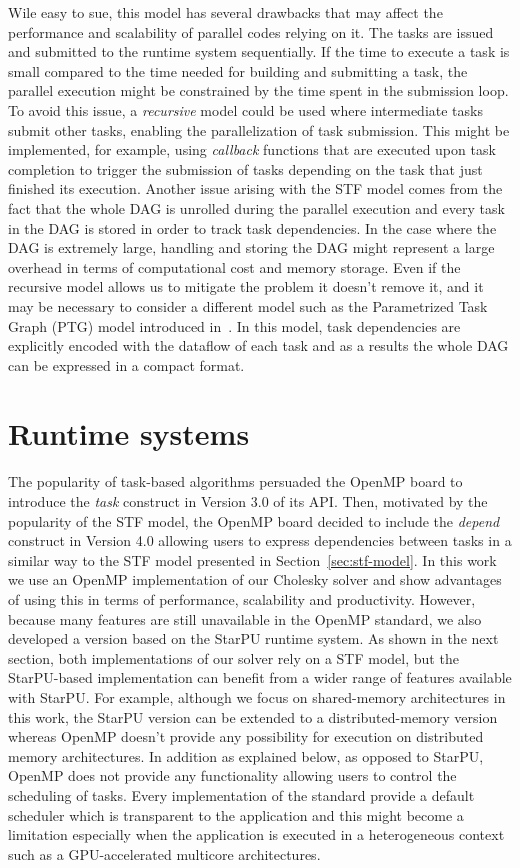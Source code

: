 \documentclass{article}
\newcommand{\starpu}{{StarPU}\xspace}
\newcommand{\openmp}{OpenMP\xspace}
\newcommand{\lsection}[1]{\section{#1} \setcounter{equation}{0} \setcounter{figure}{0} \setcounter{table}{0} \label{#1}}
\begin{document}
Wile easy to sue, this model
has several drawbacks that may affect the performance and scalability
of parallel codes relying on it. The tasks are issued and submitted to
the runtime system sequentially. If the time to execute a task
is small compared to the time needed for building
and submitting a task, the parallel execution might be constrained
by the time spent in the submission loop.
To avoid this issue, a
\textit{recursive} model could be used where intermediate tasks
submit other tasks, enabling the parallelization of task submission.
This might be implemented, for example, using
\textit{callback} functions that are executed upon task completion to
trigger the submission of tasks depending on the task that just
finished its execution. Another issue arising with the STF model comes
from the fact that the whole DAG is unrolled during the parallel
execution and every task in the DAG is stored in order to track task
dependencies. In the case where the DAG is extremely large, handling
and storing the DAG might represent a large overhead in terms of
computational cost and memory storage. Even if the recursive model
allows us to mitigate the problem it doesn't remove it, and it may be
necessary to consider a different model such as the
Parametrized Task Graph (PTG) model introduced in~\cite{c.l:95}. In
this model, task dependencies are explicitly encoded with the dataflow
of each task and as a results the whole DAG can be expressed in a
compact format.


\lsection{Runtime systems}\label{sec:runtime}
\setcounter{equation}{0}
\setcounter{table}{0}
\setcounter{figure}{0}

The popularity of task-based algorithms persuaded the OpenMP board to
introduce the \textit{task} construct in Version 3.0 of its API. Then,
motivated by the popularity of the STF model, the OpenMP board decided
to include the \textit{depend} construct in Version 4.0 allowing users
to express dependencies between tasks in a similar way to the STF
model presented in Section~\ref{sec:stf-model}. In this work we use an
OpenMP implementation of our Cholesky solver and show advantages of
using this in terms of performance, scalability and
productivity. However, because many features are still unavailable in
the OpenMP standard, we also developed a version based on the StarPU
runtime system. As shown in the next section, both implementations of
our solver rely on a STF model, but the StarPU-based implementation
can benefit from a wider range of features available with StarPU. For
example, although we focus on shared-memory architectures in this
work, the \starpu version can be extended to a distributed-memory
version whereas \openmp doesn't provide any possibility for execution
on distributed memory architectures. In addition as explained below,
as opposed to \starpu, \openmp does not provide any functionality
allowing users to control the scheduling of tasks. Every
implementation of the standard provide a default scheduler which is
transparent to the application and this might become a limitation
especially when the application is executed in a heterogeneous context
such as a GPU-accelerated multicore architectures.
\end{document}
